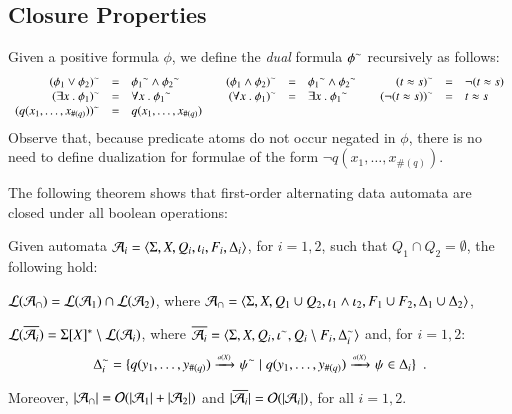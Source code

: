 \documentclass{llncs}
\begin{document}
\subsection{Closure Properties}

Given a positive formula $\phi$, we define the \emph{dual} formula
${\phi}^{\sim}$ recursively as follows:
\[\begin{array}{rclcrclcrcl}
{(\phi_1 \vee \phi_2)}^{\sim} & = & {\phi_1}^{\sim} \wedge {\phi_2}^{\sim} && 
{(\phi_1 \wedge \phi_2)}^{\sim} & = & {\phi_1}^{\sim} \wedge {\phi_2}^{\sim} &&
{(t \approx s)}^{\sim} & = & \neg(t \approx s) \\
{(\exists x ~.~ \phi_1)}^{\sim} & = & \forall x ~.~ {\phi_1}^{\sim} && 
{(\forall x ~.~ \phi_1)}^{\sim} & = & \exists x ~.~ {\phi_1}^{\sim} && 
{(\neg(t \approx s))}^{\sim} & = & t \approx s \\
{(q(x_1,\ldots,x_{\#(q)}))}^{\sim} & = & q(x_1,\ldots,x_{\#(q)})
\end{array}\]
Observe that, because predicate atoms do not occur negated in $\phi$,
there is no need to define dualization for formulae of the form $\neg
q(x_1,\ldots,x_{\#(q)})$. 


The following theorem shows that first-order alternating data automata
are closed under all boolean operations: 

\begin{theorem}\label{thm:closure}
  Given automata $\mathcal{A}_i = \langle \Sigma,X,Q_i,\iota_i,F_i,\Delta_i \rangle$,
  for $i=1,2$, such that $Q_1 \cap Q_2 = \emptyset$, the following hold: 
  \begin{compactitem}
    \item\label{it1:closure} ${\mathcal L}({\mathcal{A}_\cap}) = {\mathcal L}({\mathcal{A}_1}) \cap {\mathcal L}({\mathcal{A}_2})$, where
      $\mathcal{A}_\cap = \langle \Sigma,X,Q_1 \cup Q_2, \iota_1 \wedge \iota_2,
      F_1 \cup F_2, \Delta_1 \cup \Delta_2 \rangle$, 
    \item\label{it2:closure} ${\mathcal L}({\overline{\mathcal{A}_i}}) = \Sigma[X]^*
      \setminus {\mathcal L}({\mathcal{A}_i})$, where $\overline{\mathcal{A}_i} =
      \langle \Sigma,X,Q_i,{\iota}^{\sim},Q_i\setminus
        F_i,{\Delta}^{\sim}_i \rangle$ and, for $i=1,2$: \[{\Delta}^{\sim}_i =
      \{ q(y_1,\ldots,y_{\#(q)}) \xrightarrow{{\scriptscriptstyle a(X)}}_{{\scriptstyle }} {\psi}^{\sim} \mid
        q(y_1,\ldots,y_{\#(q)}) \xrightarrow{{\scriptscriptstyle a(X)}}_{{\scriptstyle }} \psi \in
        \Delta_i \}\enspace.\]
  \end{compactitem}
  Moreover, ${|{\mathcal{A}_\cap}|} = \mathcal{O}({{|{\mathcal{A}_1}|}+{|{\mathcal{A}_2}|}})$ and
  ${|{\overline{\mathcal{A}_i}}|} = \mathcal{O}({{|{\mathcal{A}_i}|}})$, for all $i=1,2$.
\end{theorem}
\proof{\qed}
\end{document}
